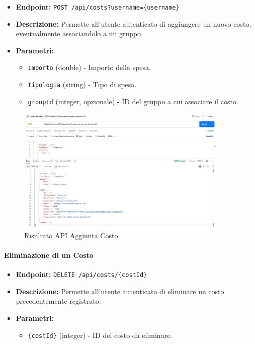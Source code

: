 \begin{itemize}
    \item \textbf{Endpoint:} \texttt{POST /api/costs?username=\{username\}}
    \item \textbf{Descrizione:} Permette all'utente autenticato di aggiungere un nuovo costo, eventualmente associandolo a un gruppo.
    \item \textbf{Parametri:}
    \begin{itemize}
        \item \texttt{importo} (double) - Importo della spesa.
        \item \texttt{tipologia} (string) - Tipo di spesa.
        \item \texttt{groupId} (integer, opzionale) - ID del gruppo a cui associare il costo.
    \end{itemize}
\end{itemize}
\newpage
\begin{figure}[h!]
    \centering
    \includegraphics[width=0.9\textwidth]{images/createCost.jpeg}
    \caption{Risultato API Aggiunta Costo}
    \label{fig:api_add_cost}
\end{figure}

\paragraph{Eliminazione di un Costo}  

\begin{itemize}
    \item \textbf{Endpoint:} \texttt{DELETE /api/costs/\{costId\}}
    \item \textbf{Descrizione:} Permette all'utente autenticato di eliminare un costo precedentemente registrato.
    \item \textbf{Parametri:}
    \begin{itemize}
        \item \texttt{\{costId\}} (integer) - ID del costo da eliminare.
    \end{itemize}
\end{itemize}

